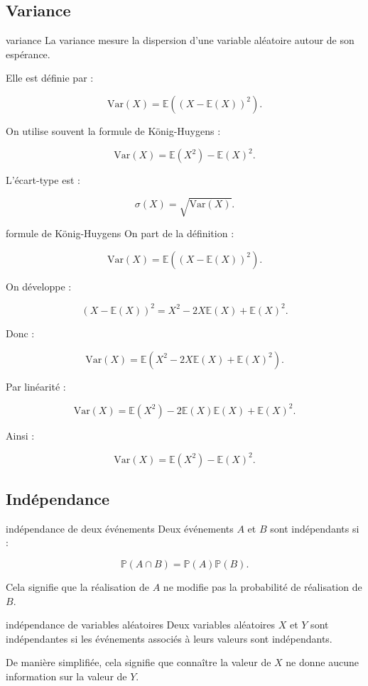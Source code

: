 \documentclass[11pt,a4paper]{article}
\newcommand{\E}{\mathbb{E}}
\newcommand{\V}{\mathrm{Var}}
\newcommand{\Prob}{\mathbb{P}}
\begin{document}
\subsection{Variance}

\begin{definitionbox}{variance}
La variance mesure la dispersion d'une variable aléatoire autour de son espérance.

Elle est définie par :

\[
\V(X)=\E\left((X-\E(X))^2\right).
\]

On utilise souvent la formule de König-Huygens :

\[
\V(X)=\E(X^2)-\E(X)^2.
\]

L'écart-type est :

\[
\sigma(X)=\sqrt{\V(X)}.
\]
\end{definitionbox}

\begin{preuve}{formule de König-Huygens}
On part de la définition :

\[
\V(X)=\E\left((X-\E(X))^2\right).
\]

On développe :

\[
(X-\E(X))^2=X^2-2X\E(X)+\E(X)^2.
\]

Donc :

\[
\V(X)=\E(X^2-2X\E(X)+\E(X)^2).
\]

Par linéarité :

\[
\V(X)=\E(X^2)-2\E(X)\E(X)+\E(X)^2.
\]

Ainsi :

\[
\V(X)=\E(X^2)-\E(X)^2.
\]
\end{preuve}

\subsection{Indépendance}

\begin{definitionbox}{indépendance de deux événements}
Deux événements $A$ et $B$ sont indépendants si :

\[
\Prob(A\cap B)=\Prob(A)\Prob(B).
\]

Cela signifie que la réalisation de $A$ ne modifie pas la probabilité de réalisation de $B$.
\end{definitionbox}

\begin{definitionbox}{indépendance de variables aléatoires}
Deux variables aléatoires $X$ et $Y$ sont indépendantes si les événements associés à leurs valeurs sont indépendants.

De manière simplifiée, cela signifie que connaître la valeur de $X$ ne donne aucune information sur la valeur de $Y$.
\end{definitionbox}
\end{document}
